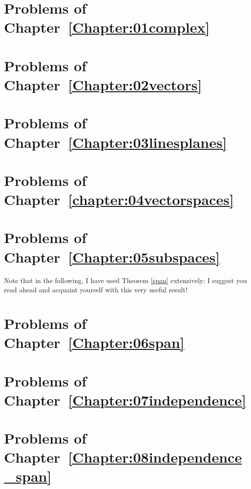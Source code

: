 

\section*{Problems of Chapter~\ref{Chapter:01complex}}


\section*{Problems of Chapter~\ref{Chapter:02vectors}}
   
 
\section*{Problems of Chapter~\ref{Chapter:03linesplanes}}


\section*{Problems of Chapter~\ref{chapter:04vectorspaces}}


 
\section*{Problems of Chapter~\ref{Chapter:05subspaces}}

Note that in the  following, I have used Theorem \ref{span} extensively: I suggest you read ahead and acquaint yourself with this very useful result!




\section*{Problems of Chapter~\ref{Chapter:06span}}



\section*{Problems of Chapter~\ref{Chapter:07independence}}


\section*{Problems of Chapter~\ref{Chapter:08independence_span}}


